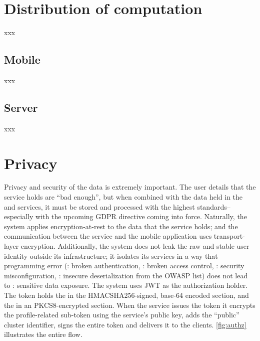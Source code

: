 \section{Distribution of computation}
xxx

\subsection{Mobile}
xxx

\subsection{Server}
xxx

\section{Privacy}
Privacy and security of the data is extremely important. The user details that the  service holds are ``bad enough'', but when combined with the data held in the  and  services, it must be stored and processed with the highest standards--especially with the upcoming GDPR\cite{gdpr} directive coming into force. Naturally, the system applies encryption-at-rest to the data that the  service holds; and the communication between the  service and the mobile application uses transport-layer encryption. Additionally, the system does not leak the raw and stable user identity outside its infrastructure; it isolates its services in a way that programming error (: broken authentication, : broken access control, : security misconfiguration, : insecure deserialization from the OWASP\cite{owasp} list) does not lead to : sensitive data exposure. The system uses JWT\cite{jwt} as the authorization holder. The token holds the  in the HMACSHA256-signed, base-64 encoded section, and the  in an PKCS8-encrypted section. When the  service issues the token it encrypts the profile-related sub-token using the  service's public key, adds the ``public'' cluster identifier, signs the entire token and delivers it to the clients. \autoref{fig:authz} illustrates the entire flow.



